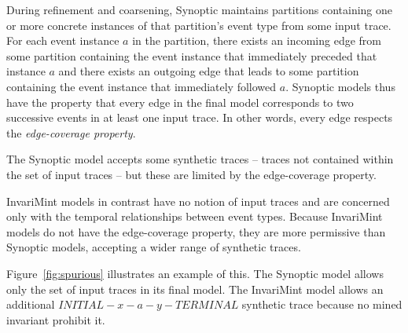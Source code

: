 During refinement and coarsening, 
Synoptic maintains partitions containing one or more
concrete instances of that partition's event type from some input trace.
For each event instance $a$ in the partition, there exists an incoming edge from some
partition containing the event instance that immediately preceded that instance $a$ and there
exists an outgoing edge that leads to some partition containing
the event instance that immediately followed $a$.
Synoptic models thus have the property that every edge in the final model corresponds
to two successive events in at least one input trace. In other words, every edge
respects the \emph{edge-coverage property}.

The Synoptic model accepts some synthetic traces -- traces not contained within
the set of 
input traces -- but these are limited by the edge-coverage property.

InvariMint models in contrast have no notion of input traces and are concerned
only with the temporal relationships between event types.
Because InvariMint models
do not have the edge-coverage property, they are
more permissive than Synoptic models, accepting a wider range of synthetic
traces.

Figure~\ref{fig:spurious} illustrates an example of this.
The Synoptic model allows only the set of input traces in its final model.
The InvariMint model allows 
an additional $INITIAL-x-a-y-TERMINAL$ synthetic trace because no mined
invariant prohibit it.

